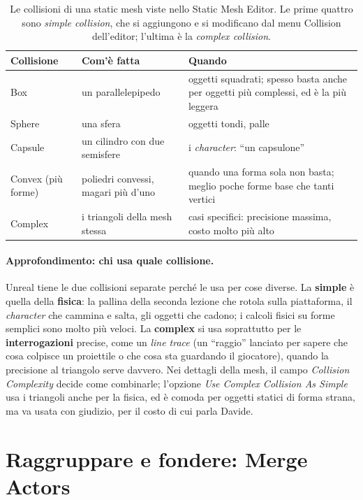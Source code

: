 \begin{table}[htbp]
\centering
\small
\begin{tabular}{@{}p{3.3cm}p{4.4cm}p{5.3cm}@{}}
\toprule
\textbf{Collisione} & \textbf{Com'è fatta} & \textbf{Quando} \\
\midrule
Box & un parallelepipedo & oggetti squadrati; spesso basta anche per oggetti più
  complessi, ed è la più leggera \\
Sphere & una sfera & oggetti tondi, palle \\
Capsule & un cilindro con due semisfere & i \emph{character}: ``un capsulone'' \\
Convex (più forme) & poliedri convessi, magari più d'uno & quando una forma sola non
  basta; meglio poche forme base che tanti vertici \\
Complex & i triangoli della mesh stessa & casi specifici: precisione massima, costo
  molto più alto \\
\bottomrule
\end{tabular}
\caption{Le collisioni di una static mesh viste nello Static Mesh Editor. Le prime
quattro sono \emph{simple collision}, che si aggiungono e si modificano dal menu
Collision dell'editor; l'ultima è la \emph{complex collision}.}
\label{ue3:tab:collisioni}
\end{table}

\paragraph{Approfondimento: chi usa quale collisione.} Unreal tiene le due collisioni
separate perché le usa per cose diverse. La \textbf{simple} è quella della
\textbf{fisica}: la pallina della seconda lezione che rotola sulla piattaforma, il
\emph{character} che cammina e salta, gli oggetti che cadono; i calcoli fisici su forme
semplici sono molto più veloci. La \textbf{complex} si usa soprattutto per le
\textbf{interrogazioni} precise, come un \emph{line trace} (un ``raggio'' lanciato per
sapere che cosa colpisce un proiettile o che cosa sta guardando il giocatore), quando
la precisione al triangolo serve davvero. Nei dettagli della mesh, il campo
\emph{Collision Complexity} decide come combinarle; l'opzione \emph{Use Complex
Collision As Simple} usa i triangoli anche per la fisica, ed è comoda per oggetti
statici di forma strana, ma va usata con giudizio, per il costo di cui parla Davide.

\section{Raggruppare e fondere: Merge Actors}
\label{ue3:sec:merge}

